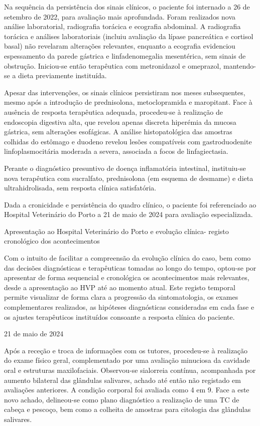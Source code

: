 Na sequência da persistência dos sinais clínicos, o paciente foi internado a 26 de setembro de 2022, para avaliação mais aprofundada. Foram realizados nova análise laboratorial, radiografia torácica e ecografia abdominal. A radiografia torácica e análises laboratoriais (incluiu avaliação da lípase pancreática e cortisol basal) não revelaram alterações relevantes, enquanto a ecografia evidenciou espessamento da parede gástrica e linfadenomegalia mesentérica, sem sinais de obstrução. Iniciou-se então terapêutica com metronidazol e omeprazol, mantendo-se a dieta previamente instituída.


Apesar das intervenções, os sinais clínicos persistiram nos meses subsequentes, mesmo após a introdução de prednisolona, metoclopramida e maropitant. Face à ausência de resposta terapêutica adequada, procedeu-se à realização de endoscopia digestiva alta, que revelou apenas discreta hiperémia da mucosa gástrica, sem alterações esofágicas.  A análise histopatológica das amostras colhidas do estômago e duodeno revelou lesões compatíveis com gastroduodenite linfoplasmocitária moderada a severa, associada a focos de linfagiectasia. 


Perante o diagnóstico presuntivo de doença inflamatória intestinal, instituiu-se nova terapêutica com sucralfato, prednisolona (em esquema de desmame) e dieta ultrahidrolisada, sem resposta clínica satisfatória.


Dada a cronicidade e persistência do quadro clínico, o paciente foi referenciado ao Hospital Veterinário do Porto a 21 de maio de 2024 para avaliação especializada.


Apresentação ao Hospital Veterinário do Porto e evolução clínica- registo cronológico dos acontecimentos


Com o intuito de facilitar a compreensão da evolução clínica do caso, bem como das decisões diagnósticas e terapêuticas tomadas ao longo do tempo, optou-se por apresentar de forma sequencial e cronológica os acontecimentos mais relevantes, desde a apresentação ao HVP até ao momento atual. Este registo temporal permite visualizar de forma clara a progressão da sintomatologia, os exames complementares realizados, as hipóteses diagnósticas consideradas em cada fase e os ajustes terapêuticos instituídos consoante a resposta clínica do paciente.

21 de maio de 2024


Após a receção e troca de informações com os tutores, procedeu-se à realização do exame físico geral, complementado por uma avaliação minuciosa da cavidade oral e estruturas maxilofaciais. Observou-se sialorreia contínua, acompanhada por aumento bilateral das glândulas salivares, achado até então não registado em avaliações anteriores. A condição corporal foi avaliada como 4 em 9. 
Face a este novo achado, delineou-se como plano diagnóstico a realização de uma TC de cabeça e pescoço, bem como a colheita de amostras para citologia das glândulas salivares.


